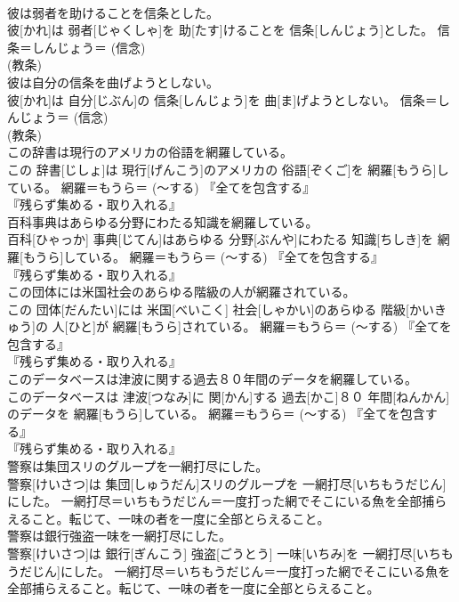 \documentclass[8pt]{extreport}
\begin{document}
\begin{CJK}{UTF8}{min}
{\\	彼は弱者を助けることを信条とした。	
\\	彼[かれ]は 弱者[じゃくしゃ]を 助[たす]けることを 信条[しんじょう]とした。	信条＝しんじょう＝ (信念) 
\\	(教条) 
\\	彼は自分の信条を曲げようとしない。	
\\	彼[かれ]は 自分[じぶん]の 信条[しんじょう]を 曲[ま]げようとしない。	信条＝しんじょう＝ (信念) 
\\	(教条) 
\\	この辞書は現行のアメリカの俗語を網羅している。	
\\	この 辞書[じしょ]は 現行[げんこう]のアメリカの 俗語[ぞくご]を 網羅[もうら]している。	網羅＝もうら＝ (〜する) 『全てを包含する』
\\	『残らず集める・取り入れる』
\\	百科事典はあらゆる分野にわたる知識を網羅している。	
\\	百科[ひゃっか] 事典[じてん]はあらゆる 分野[ぶんや]にわたる 知識[ちしき]を 網羅[もうら]している。	網羅＝もうら＝ (〜する) 『全てを包含する』
\\	『残らず集める・取り入れる』
\\	この団体には米国社会のあらゆる階級の人が網羅されている。	
\\	この 団体[だんたい]には 米国[べいこく] 社会[しゃかい]のあらゆる 階級[かいきゅう]の 人[ひと]が 網羅[もうら]されている。	網羅＝もうら＝ (〜する) 『全てを包含する』
\\	『残らず集める・取り入れる』
\\	このデータベースは津波に関する過去８０年間のデータを網羅している。	
\\	このデータベースは 津波[つなみ]に 関[かん]する 過去[かこ]８０ 年間[ねんかん]のデータを 網羅[もうら]している。	網羅＝もうら＝ (〜する) 『全てを包含する』
\\	『残らず集める・取り入れる』
\\	警察は集団スリのグループを一網打尽にした。	
\\	警察[けいさつ]は 集団[しゅうだん]スリのグループを 一網打尽[いちもうだじん]にした。	一網打尽＝いちもうだじん＝一度打った網でそこにいる魚を全部捕らえること。転じて、一味の者を一度に全部とらえること。
\\	警察は銀行強盗一味を一網打尽にした。	
\\	警察[けいさつ]は 銀行[ぎんこう] 強盗[ごうとう] 一味[いちみ]を 一網打尽[いちもうだじん]にした。	一網打尽＝いちもうだじん＝一度打った網でそこにいる魚を全部捕らえること。転じて、一味の者を一度に全部とらえること。
}
\end{CJK}
\end{document}
